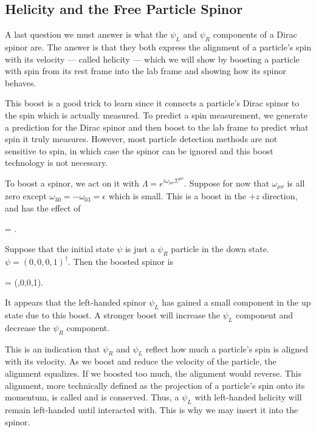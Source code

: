\subsection{Helicity and the Free Particle Spinor}

A last question we must answer is what the $\psi_L$ and $\psi_R$ components of a Dirac spinor are. The answer is that they both express the alignment of a particle's spin with its velocity --- called helicity --- which we will show by boosting a particle with spin from its rest frame into the lab frame and showing how its spinor behaves.

This boost is a good trick to learn since it connects a particle's Dirac spinor to the spin which is actually measured. To predict a spin measurement, we generate a prediction for the Dirac spinor and then boost to the lab frame to predict what spin it truly measures. However, most particle detection methods are not sensitive to spin, in which case the spinor can be ignored and this boost technology is not necessary.

To boost a spinor, we act on it with $\Lambda = e^{i\omega_{\mu\nu}\Sigma^{\mu\nu}}$. Suppose for now that $\omega_{\mu\nu}$ is all zero except $\omega_{30}=-\omega_{03}=\epsilon$ which is small. This is a boost in the $+z$ direction, and has the effect of
\begin{e}
  \Lambda \psi = \psi.
\end{e}
Suppose that the initial state $\psi$ is just a $\psi_R$ particle in the down state. $\psi = (0,0,0,1)^\dagger$. Then the boosted spinor is
\begin{e}
  \Lambda \psi = (\epsilon,0,0,1).
\end{e}
It appears that the left-handed spinor $\psi_L$ has gained a small component in the up state due to this boost. A stronger boost will increase the $\psi_L$ component and decrease the $\psi_R$ component.

This is an indication that $\psi_R$ and $\psi_L$ reflect how much a particle's spin is aligned with its velocity. As we boost and reduce the velocity of the particle, the alignment equalizes. If we boosted too much, the alignment would reverse. This alignment, more technically defined as the projection of a particle's spin onto its momentum, is called  and is conserved. Thus, a $\psi_L$ with left-handed helicity will remain left-handed until interacted with. This is why we may insert it into the spinor.

